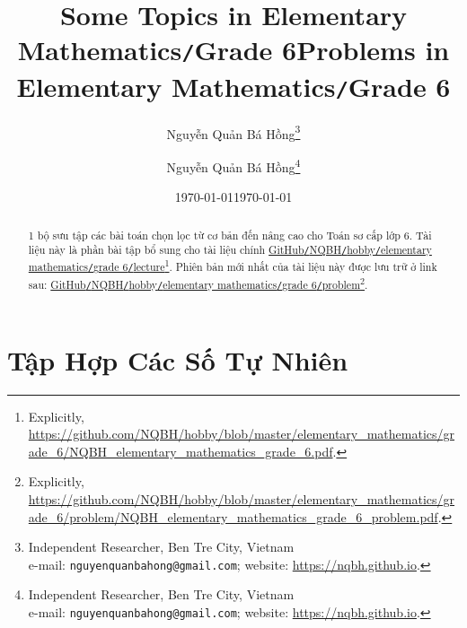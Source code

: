 \documentclass{article}
\title{Some Topics in Elementary Mathematics\texttt{/}Grade 6}
\author{Nguyễn Quản Bá Hồng\footnote{Independent Researcher, Ben Tre City, Vietnam\\e-mail: \texttt{nguyenquanbahong@gmail.com}; website: \url{https://nqbh.github.io}.}}
\date{\today}
\title{Problems in Elementary Mathematics\texttt{/}Grade 6}
\author{Nguyễn Quản Bá Hồng\footnote{Independent Researcher, Ben Tre City, Vietnam\\e-mail: \texttt{nguyenquanbahong@gmail.com}; website: \url{https://nqbh.github.io}.}}
\date{\today}
\numberwithin{equation}{section}
\begin{document}
\maketitle
\begin{abstract}
	1 bộ sưu tập các bài toán chọn lọc từ cơ bản đến nâng cao cho Toán sơ cấp lớp 6. Tài liệu này là phần bài tập bổ sung cho tài liệu chính \href{https://github.com/NQBH/hobby/blob/master/elementary_mathematics/grade_6/NQBH_elementary_mathematics_grade_6.pdf}{GitHub\texttt{/}NQBH\texttt{/}hobby\texttt{/}elementary mathematics\texttt{/}grade 6\texttt{/}lecture}\footnote{Explicitly, \url{https://github.com/NQBH/hobby/blob/master/elementary_mathematics/grade_6/NQBH_elementary_mathematics_grade_6.pdf}.}. Phiên bản mới nhất của tài liệu này được lưu trữ ở link sau: \href{https://github.com/NQBH/hobby/blob/master/elementary_mathematics/grade_6/problem/NQBH_elementary_mathematics_grade_6_problem.pdf}{GitHub\texttt{/}NQBH\texttt{/}hobby\texttt{/}elementary mathematics\texttt{/}grade 6\texttt{/}problem}\footnote{Explicitly, \url{https://github.com/NQBH/hobby/blob/master/elementary_mathematics/grade_6/problem/NQBH_elementary_mathematics_grade_6_problem.pdf}.}.
\end{abstract}

\tableofcontents
\newpage


\section{Tập Hợp Các Số Tự Nhiên}
\end{document}
